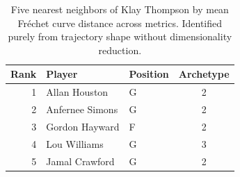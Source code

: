 \begin{table}[htbp]
  \centering\small
  \begin{tabular}{rllc}
    \toprule
    Rank & Player & Position & Archetype \\
    \midrule
    1 & Allan Houston & G & 2 \\
    2 & Anfernee Simons & G & 2 \\
    3 & Gordon Hayward & F & 2 \\
    4 & Lou Williams & G & 3 \\
    5 & Jamal Crawford & G & 2 \\
    \bottomrule
  \end{tabular}
  \caption{Five nearest neighbors of Klay Thompson by mean Fr\'{e}chet curve distance across metrics. Identified purely from trajectory shape without dimensionality reduction.}
  \label{tab:Klay_Thompson_frechet_curve_neighbors}
\end{table}

